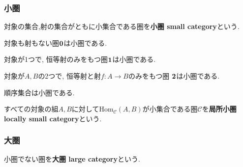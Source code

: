 \subsubsection{小圏}
\begin{Def}
対象の集合,射の集合がともに小集合である圏を{\bf 小圏 small category}という.
\end{Def}
\begin{Prop}
対象も射もない圏${\bf 0}$は小圏である.
\end{Prop}
\begin{Prop}
対象が1つで, 恒等射のみをもつ圏${\bf 1}$は小圏である.
\end{Prop}
\begin{Prop}
対象が$A,B$の2つで, 
恒等射と射$f:A\rightarrow B$のみをもつ圏
${\bf 2}$は小圏である.
\end{Prop}
\begin{Prop}
順序集合は小圏である.
\end{Prop}
\begin{Def}
すべての対象の組$A,B$に対して$\mathrm{Hom}_{\mathscr{C}}(A,B)$が小集合である圏$\mathscr{C}$を{\bf 局所小圏 locally small category}という.
\end{Def}
\subsubsection{大圏}
\begin{Def}
小圏でない圏を{\bf 大圏 large category}という.
\end{Def}

